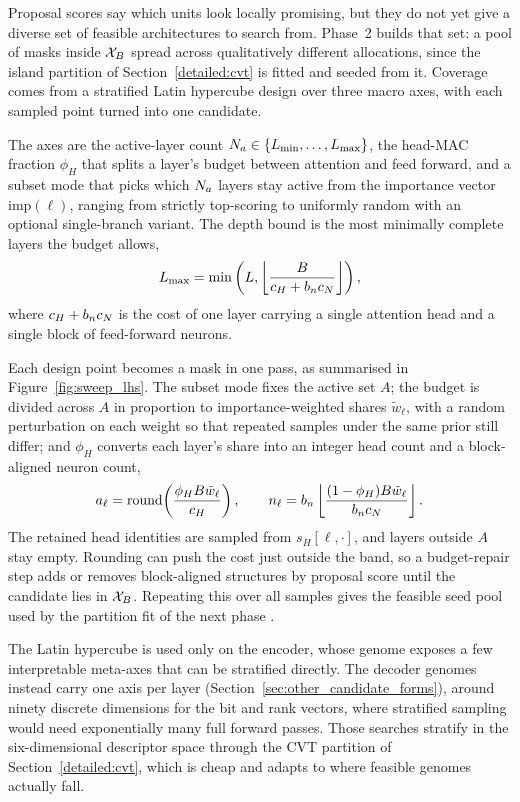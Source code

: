 Proposal scores say which units look locally promising, but they do not yet give a diverse set of feasible architectures to search from. Phase~2 builds that set: a pool of masks inside $\mathcal{X}_B$ spread across qualitatively different allocations, since the island partition of Section~\ref{detailed:cvt} is fitted and seeded from it. Coverage comes from a stratified Latin hypercube design \citep{mckay1979comparison} over three macro axes, with each sampled point turned into one candidate.

The axes are the active-layer count $N_a \in \{L_{\min}, \ldots, L_{\max}\}$, the head-MAC fraction $\phi_H$ that splits a layer's budget between attention and feed forward, and a subset mode that picks which $N_a$ layers stay active from the importance vector $\mathrm{imp}(\ell)$, ranging from strictly top-scoring to uniformly random with an optional single-branch variant. The depth bound is the most minimally complete layers the budget allows,
\[
L_{\max}
=
\min\left(
L,
\left\lfloor
\frac{B}{c_{H} + b_nc_{N}}
\right\rfloor
\right),
\]
where $c_{H} + b_nc_{N}$ is the cost of one layer carrying a single attention head and a single block of feed-forward neurons.

Each design point becomes a mask in one pass, as summarised in Figure~\ref{fig:sweep_lhs}. The subset mode fixes the active set $A$; the budget is divided across $A$ in proportion to importance-weighted shares $\tilde w_\ell$, with a random perturbation on each weight so that repeated samples under the same prior still differ; and $\phi_H$ converts each layer's share into an integer head count and a block-aligned neuron count,
\[
a_{\ell} =
\mathrm{round}\!\left(
\frac{\phi_H B \tilde w_\ell}{c_{H}}
\right),
\qquad
n_{\ell} =
b_n
\left\lfloor
\frac{(1-\phi_H)B \tilde w_\ell}{b_nc_{N}}
\right\rfloor .
\]
The retained head identities are sampled from $s_H[\ell,\cdot]$, and layers outside $A$ stay empty. Rounding can push the cost just outside the band, so a budget-repair step adds or removes block-aligned structures by proposal score until the candidate lies in $\mathcal{X}_B$. Repeating this over all samples gives the feasible seed pool used by the partition fit of the next phase \citep{du1999centroidal}.

The Latin hypercube is used only on the encoder, whose genome exposes a few interpretable meta-axes that can be stratified directly. The decoder genomes instead carry one axis per layer (Section~\ref{sec:other_candidate_forms}), around ninety discrete dimensions for the bit and rank vectors, where stratified sampling would need exponentially many full forward passes. Those searches stratify in the six-dimensional descriptor space through the CVT partition of Section~\ref{detailed:cvt}, which is cheap and adapts to where feasible genomes actually fall.

